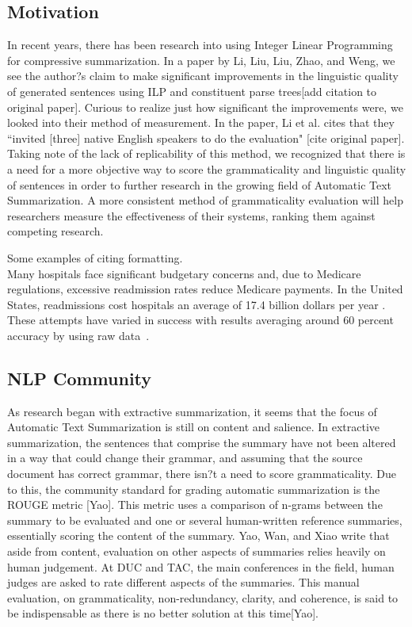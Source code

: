\documentclass[11pt,a4paper]{article}
\begin{document}
\begin{multicols}{2}
\subsection{Motivation}
In recent years, there has been research into using Integer Linear Programming for compressive summarization. In a paper by Li, Liu, Liu, Zhao, and Weng, we see the author?s claim to make significant improvements in the linguistic quality of generated sentences using ILP and constituent parse trees[add citation to original paper]. Curious to realize just how significant the improvements were, we looked into their method of measurement. In the paper, Li et al. cites that they ``invited [three] native English speakers to do the evaluation" [cite original paper]. Taking note of the lack of replicability of this method, we recognized that there is a need for a more objective way to score the grammaticality and linguistic quality of sentences in order to further research in the growing field of Automatic Text Summarization. A more consistent method of grammaticality evaluation will help researchers measure the effectiveness of their systems, ranking them against competing research.


Some examples of citing formatting.\\

Many hospitals face significant budgetary concerns and, due to Medicare regulations, excessive readmission rates reduce Medicare payments. In the United States, readmissions cost hospitals an average of 17.4 billion dollars per year \cite{catlin2008}. These attempts have varied in success with results averaging around 60 percent accuracy by using raw data~\cite{kansagara2011}. 

\subsection{NLP Community}
As research began with extractive summarization, it seems that the focus of Automatic Text Summarization is still on content and salience. In extractive summarization, the sentences that comprise the summary have not been altered in a way that could change their grammar, and assuming that the source document has correct grammar, there isn?t a need to score grammaticality. Due to this, the community standard for grading automatic summarization is the ROUGE metric [Yao]. This metric uses a comparison of n-grams between the summary to be evaluated and one or several human-written reference summaries, essentially scoring the content of the summary. Yao, Wan, and Xiao write that aside from content, evaluation on other aspects of summaries relies heavily on human judgement. At DUC and TAC, the main conferences in the field, human judges are asked to rate different aspects of the summaries. This manual evaluation, on grammaticality, non-redundancy, clarity, and coherence, is said to be indispensable as there is no better solution at this time[Yao].


\end{multicols}
\end{document}
